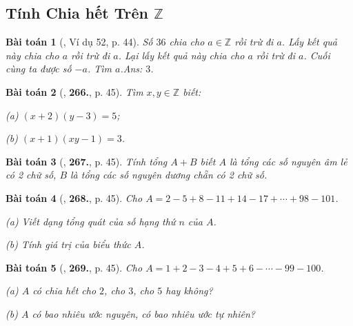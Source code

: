 \documentclass{article}
\numberwithin{equation}{section}
\newtheorem{baitoan}{Bài toán}
\begin{document}

\subsection{Tính Chia hết Trên $\mathbb{Z}$}

\begin{baitoan}[\cite{Binh_Toan_6_tap_1}, Ví dụ 52, p. 44]
	Số $36$ chia cho $a\in\mathbb{Z}$ rồi trừ đi $a$. Lấy kết quả này chia cho $a$ rồi trừ đi $a$. Lại lấy kết quả này chia cho $a$ rồi trừ đi $a$. Cuối cùng ta được số $-a$. Tìm $a$.\hfill\textsf{Ans:} $3$.
\end{baitoan}

\begin{baitoan}[\cite{Binh_Toan_6_tap_1}, \textbf{266.}, p. 45]
	Tìm $x,y\in\mathbb{Z}$ biết:
	\begin{enumerate*}
		\item[(a)] $(x + 2)(y - 3) = 5$;
		\item[(b)] $(x + 1)(xy - 1) = 3$.
	\end{enumerate*}
\end{baitoan}

\begin{baitoan}[\cite{Binh_Toan_6_tap_1}, \textbf{267.}, p. 45]
	Tính tổng $A + B$ biết $A$ là tổng các số nguyên âm lẻ có 2 chữ số, $B$ là tổng các số nguyên dương chẵn có 2 chữ số.
\end{baitoan}

\begin{baitoan}[\cite{Binh_Toan_6_tap_1}, \textbf{268.}, p. 45]
	Cho $A = 2 - 5 + 8 - 11 + 14 - 17 + \cdots + 98 - 101$.
	\begin{enumerate*}
		\item[(a)] Viết dạng tổng quát của số hạng thứ $n$ của $A$.
		\item[(b)] Tính giá trị của biểu thức $A$.
	\end{enumerate*}
\end{baitoan}

\begin{baitoan}[\cite{Binh_Toan_6_tap_1}, \textbf{269.}, p. 45]
	Cho $A = 1 + 2 - 3 - 4 + 5 + 6 - \cdots - 99 - 100$.
	\begin{enumerate*}
		\item[(a)] $A$ có chia hết cho $2$, cho $3$, cho $5$ hay không?
		\item[(b)] $A$ có bao nhiêu ước nguyên, có bao nhiêu ước tự nhiên?
	\end{enumerate*}
\end{baitoan}
\end{document}
